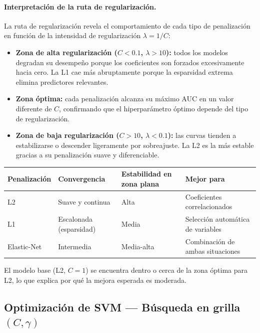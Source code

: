 \documentclass[spanish]{article}
\begin{document}
\paragraph{Interpretación de la ruta de regularización.}

La ruta de regularización revela el comportamiento de cada tipo de penalización en función de la intensidad de regularización $\lambda = 1/C$:

\begin{itemize}
    \item \textbf{Zona de alta regularización ($C < 0.1$, $\lambda > 10$):} todos los modelos degradan su desempeño porque los coeficientes son forzados excesivamente hacia cero. La L1 cae más abruptamente porque la esparsidad extrema elimina predictores relevantes.
    \item \textbf{Zona óptima:} cada penalización alcanza su máximo AUC en un valor diferente de $C$, confirmando que el hiperparámetro óptimo depende del tipo de regularización.
    \item \textbf{Zona de baja regularización ($C > 10$, $\lambda < 0.1$):} las curvas tienden a estabilizarse o descender ligeramente por sobreajuste. La L2 es la más estable gracias a su penalización suave y diferenciable.
\end{itemize}

\begin{center}
\begin{tabular}{llll}
\toprule
\textbf{Penalización} & \textbf{Convergencia} & \textbf{Estabilidad en zona plana} & \textbf{Mejor para} \\
\midrule
L2            & Suave y continua      & Alta        & Coeficientes correlacionados \\
L1            & Escalonada (esparsidad) & Media     & Selección automática de variables \\
Elastic-Net   & Intermedia            & Media-alta  & Combinación de ambas situaciones \\
\bottomrule
\end{tabular}
\end{center}

El modelo base (L2, $C=1$) se encuentra dentro o cerca de la zona óptima para L2, lo que explica por qué la mejora esperada es moderada.

\subsection{Optimización de SVM — Búsqueda en grilla $(C, \gamma)$}
\end{document}

